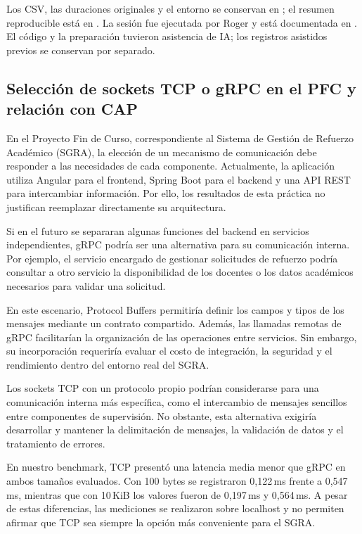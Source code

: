 Los CSV, las duraciones originales y el entorno se conservan en
; el resumen reproducible está en
. La sesión fue ejecutada por Roger y está
documentada en . El código y la preparación
tuvieron asistencia de IA; los registros asistidos previos se conservan por separado.

\subsection{Selección de sockets TCP o gRPC en el PFC y relación con CAP}

En el Proyecto Fin de Curso, correspondiente al Sistema de Gestión de Refuerzo Académico (SGRA), la elección de un mecanismo de comunicación debe responder a las necesidades de cada componente. Actualmente, la aplicación utiliza Angular para el frontend, Spring Boot para el backend y una API REST para intercambiar información. Por ello, los resultados de esta práctica no justifican reemplazar directamente su arquitectura.

Si en el futuro se separaran algunas funciones del backend en servicios independientes, gRPC podría ser una alternativa para su comunicación interna. Por ejemplo, el servicio encargado de gestionar solicitudes de refuerzo podría consultar a otro servicio la disponibilidad de los docentes o los datos académicos necesarios para validar una solicitud.

En este escenario, Protocol Buffers permitiría definir los campos y tipos de los mensajes mediante un contrato compartido. Además, las llamadas remotas de gRPC facilitarían la organización de las operaciones entre servicios. Sin embargo, su incorporación requeriría evaluar el costo de integración, la seguridad y el rendimiento dentro del entorno real del SGRA.

Los sockets TCP con un protocolo propio podrían considerarse para una comunicación interna más específica, como el intercambio de mensajes sencillos entre componentes de supervisión. No obstante, esta alternativa exigiría desarrollar y mantener la delimitación de mensajes, la validación de datos y el tratamiento de errores.

En nuestro benchmark, TCP presentó una latencia media menor que gRPC en ambos tamaños evaluados. Con 100 bytes se registraron 0,122\,ms frente a 0,547\,ms, mientras que con 10\,KiB los valores fueron de 0,197\,ms y 0,564\,ms. A pesar de estas diferencias, las mediciones se realizaron sobre localhost y no permiten afirmar que TCP sea siempre la opción más conveniente para el SGRA.


